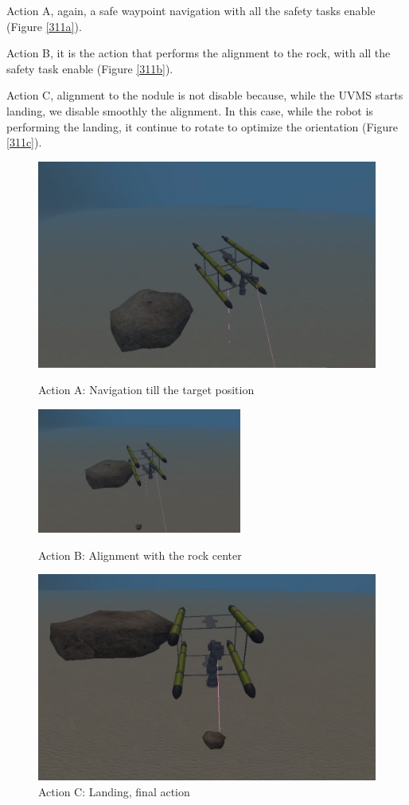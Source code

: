\documentclass{article}
\begin{document}
\begin{description}
	\item Action A, again, a safe waypoint navigation with all the safety tasks enable (Figure \ref{311a}). 
	\item Action B, it is the action that performs the alignment to the rock, with all the safety task enable (Figure \ref{311b}). 
	\item Action C, alignment to the nodule is not disable because, while the UVMS starts landing, we disable smoothly the alignment. In this case, while the robot is performing the landing, it continue to rotate to optimize the orientation (Figure \ref{311c}).
\end{description}



\begin{figure}[htp]
\centering
\includegraphics[width=.6\textwidth]{312_Nav.png}\caption{Action A: Navigation till the target position}\label{311a}
\centering
\includegraphics[width=0.6\textwidth]{312_Alr.png}\caption{Action B: Alignment with the rock center}\label{311b}
\centering
\includegraphics[width=.6\textwidth]{312_Land.png}\caption{Action C: Landing, final action}\label{311c}
\label{fig:missionphase3}
\end{figure}
\clearpage
\end{document}
